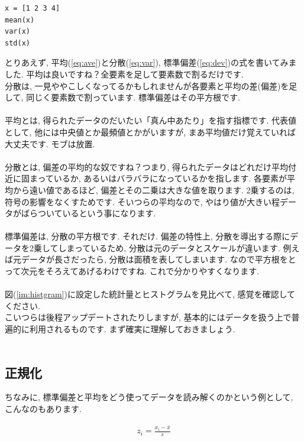 \documentclass[11pt,a4paper]{jreport}
\begin{document}
\begin{lstlisting}[caption=式(\ref{eq:ave}\ref{eq:var}\ref{eq:dev})のコード,label=stat]
x = [1 2 3 4]
mean(x)
var(x)
std(x)
\end{lstlisting}


とりあえず, 平均(\ref{eq:ave})と分散(\ref{eq:var}), 標準偏差(\ref{eq:dev})の式を書いてみました. 平均は良いですね？全要素を足して要素数で割るだけです.\\
分散は, 一見ややこしくなってるかもしれませんが各要素と平均の差(偏差)を足して, 同じく要素数で割っています. 標準偏差はその平方根です.\\
\\
平均とは, 得られたデータのだいたい「真ん中あたり」を指す指標です. 代表値として, 他には中央値とか最頻値とかがいますが, まあ平均値だけ覚えていれば大丈夫です. モブは放置.\\
\\
分散とは, 偏差の平均的な奴ですね？つまり, 得られたデータはどれだけ平均付近に固まっているか, あるいはバラバラになっているかを指します. 各要素が平均から遠い値であるほど, 偏差とその二乗は大きな値を取ります. 2乗するのは, 符号の影響をなくすためです. そいつらの平均なので, やはり値が大きい程データがばらついているという事になります.\\
\\
標準偏差は, 分散の平方根です. それだけ. 偏差の特性上, 分散を導出する際にデータを2乗してしまっているため, 分散は元のデータとスケールが違います. 例えば元データが長さだったら, 分散は面積を表してしまいます. なので平方根をとって次元をそろえてあげるわけですね. これで分かりやすくなります.\\
\\
図(\ref{im:histgram})に設定した統計量とヒストグラムを見比べて, 感覚を確認してください.
\\
こいつらは後程アップデートされたりしますが, 基本的にはデータを扱う上で普遍的に利用されるものです. まず確実に理解しておきましょう.\\
\\

\subsection{正規化}
ちなみに, 標準偏差と平均をどう使ってデータを読み解くのかという例として, こんなのもあります.

\begin{eqnarray}
\label{eq:normalize}
z_i = \frac{x_i - \bar{x}}{s}
\end{eqnarray}
\end{document}

